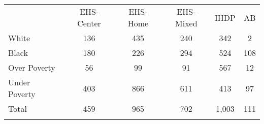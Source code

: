 \begin{tabular}{lccccc}
\hline \noalign{\smallskip} & EHS-Center & EHS-Home & EHS-Mixed & IHDP & AB\\
\noalign{\smallskip}\hline \noalign{\smallskip}White & 136 & 435 & 240 & 342 & 2\\
Black & 180 & 226 & 294 & 524 & 108\\
Over Poverty & 56 & 99 & 91 & 567 & 12\\
Under Poverty & 403 & 866 & 611 & 413 & 97\\
Total & 459 & 965 & 702 & 1,003 & 111\\
\noalign{\smallskip}\hline\end{tabular}\\
